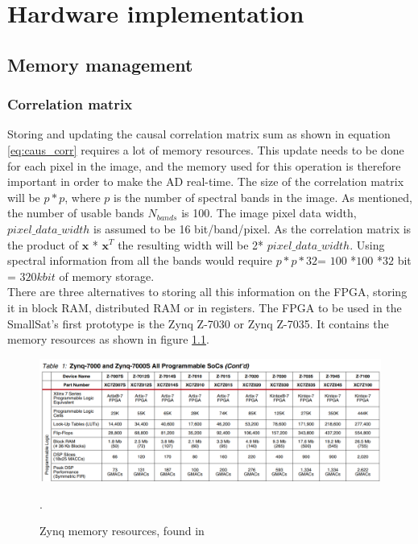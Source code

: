 \newpage
\chapter{Hardware implementation}
\label{sec:implementation}
\section{Memory management}
\label{sec:memory_management}
\subsection{Correlation matrix}
\label{sec:mem_management_correlation_matrix}
Storing and updating the causal correlation matrix sum as shown in equation \ref{eq:caus_corr} requires a lot of memory resources. This update needs to be done for each pixel in the image, and the memory used for this operation is therefore important in order to make the AD real-time. The size of the correlation matrix will be $p * p$, where $p$ is the number of spectral bands in the image. As mentioned, the number of usable bands $N_{bands}$ is 100. The image pixel data width, $pixel\_data\_width$ is assumed to be 16 bit/band/pixel. As the correlation matrix is the product of $\textbf{x}$ * $\textbf{x}^T$ the resulting width will be 2* $pixel\_data\_width$. Using spectral information from all the bands would require $p * p * 32$= $100$ *$100$ *$32$ bit = $320 kbit$ of memory storage. 
\\

There are three alternatives to storing all this information on the FPGA, storing it in block RAM, distributed RAM or in registers. The FPGA to be used in the SmallSat's first prototype is the Zynq Z-7030 or Zynq Z-7035. It contains the memory resources as shown in figure \ref{fig:zynq_memory_resources}.





\begin{figure}[H]
\centering                                                           

   \includegraphics[scale=0.5]{images/zynq_memory_resources.PNG}
  \caption{Zynq memory resources, found in \cite{cite:mem_resources_zynq}} 
  \label{fig:zynq_memory_resources}.
\end{figure}

